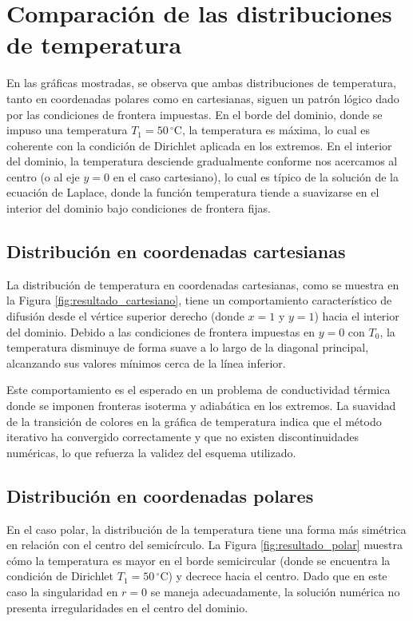 \section{Comparación de las distribuciones de temperatura}

En las gráficas mostradas, se observa que ambas distribuciones de temperatura, tanto en coordenadas polares como en cartesianas, siguen un patrón lógico dado por las condiciones de frontera impuestas. En el borde del dominio, donde se impuso una temperatura \(T_1 = 50 \,^\circ\mathrm{C}\), la temperatura es máxima, lo cual es coherente con la condición de Dirichlet aplicada en los extremos. En el interior del dominio, la temperatura desciende gradualmente conforme nos acercamos al centro (o al eje \(y = 0\) en el caso cartesiano), lo cual es típico de la solución de la ecuación de Laplace, donde la función temperatura tiende a suavizarse en el interior del dominio bajo condiciones de frontera fijas.

\subsection{Distribución en coordenadas cartesianas}

La distribución de temperatura en coordenadas cartesianas, como se muestra en la Figura \ref{fig:resultado_cartesiano}, tiene un comportamiento característico de difusión desde el vértice superior derecho (donde \(x = 1\) y \(y = 1\)) hacia el interior del dominio. Debido a las condiciones de frontera impuestas en \(y = 0\) con \(T_0\), la temperatura disminuye de forma suave a lo largo de la diagonal principal, alcanzando sus valores mínimos cerca de la línea inferior.

Este comportamiento es el esperado en un problema de conductividad térmica donde se imponen fronteras isoterma y adiabática en los extremos. La suavidad de la transición de colores en la gráfica de temperatura indica que el método iterativo ha convergido correctamente y que no existen discontinuidades numéricas, lo que refuerza la validez del esquema utilizado.

\subsection{Distribución en coordenadas polares}

En el caso polar, la distribución de la temperatura tiene una forma más simétrica en relación con el centro del semicírculo. La Figura \ref{fig:resultado_polar} muestra cómo la temperatura es mayor en el borde semicircular (donde se encuentra la condición de Dirichlet \(T_1 = 50 \,^\circ\mathrm{C}\)) y decrece hacia el centro. Dado que en este caso la singularidad en \(r = 0\) se maneja adecuadamente, la solución numérica no presenta irregularidades en el centro del dominio.

